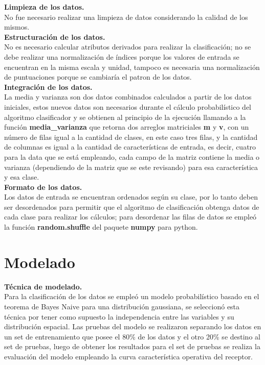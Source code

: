 \noindent
\textbf{Limpieza de los datos.}\\

No fue necesario realizar una limpieza de datos considerando la calidad de los mismos.\\

\noindent
\textbf{Estructuración de los datos.}\\

No es necesario calcular atributos derivados para realizar la clasificación; no se debe realizar
una normalización de índices porque los valores de entrada se encuentran en la misma escala y unidad,
tampoco es necesaria una normalización de puntuaciones porque se cambiaría el patron de los datos.\\

\noindent
\textbf{Integración de los datos.}\\

La media y varianza son dos datos combinados calculados a partir de los datos iniciales, estos nuevos
datos son necesarios durante el cálculo probabilístico del algoritmo clasificador y se
obtienen al principio de la ejecución llamando a la función \textbf{media\_varianza} que retorna
dos arreglos matriciales \textbf{m} y \textbf{v}, con un número de filas igual a la cantidad de clases, en este caso tres filas,
y la cantidad de columnas es igual a la cantidad de características de entrada, es decir, cuatro
para la data que se está empleando, cada campo de la matriz contiene la media o varianza (dependiendo de la
matriz que se este revisando) para esa característica y esa clase.\\

\noindent
\textbf{Formato de los datos.}\\

Los datos de entrada se encuentran ordenados según su clase, por lo tanto deben ser desordenados para permitir que el algoritmo de clasificación obtenga datos de cada clase para realizar los cálculos; para desordenar las filas de datos se empleó la función \textbf{random.shuffle} del paquete \textbf{numpy} para python.\\

\section{Modelado}

\noindent
\textbf{Técnica de modelado.}\\

Para la clasificación de los datos se empleó un modelo probabilístico basado en el teorema de Bayes Naive para una distribución
gaussiana, se seleccionó esta técnica por tener como supuesto la independencia entre las variables y su distribución
espacial. Las pruebas del modelo se realizaron separando los datos en un set de entrenamiento que posee el 80\% de los
datos y el otro 20\% se destino al set de pruebas, luego de obtener los resultados para el set de pruebas se realiza la
evaluación del modelo empleando la curva característica operativa del receptor.\\

